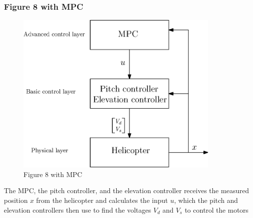 \subsubsection{Figure 8 with MPC}
\begin{figure}[H]
	\centering
	\includegraphics[width=10cm]{figurate_with_MPC}
	\caption{Figure 8 with MPC}
	\label{fig:figurate}
\end{figure}

The MPC, the pitch controller, and the elevation controller receives the measured position $x$ from the helicopter and calculates the input $u$, which the pitch and elevation controllers then use to find the voltages $V_d$ and $V_s$ to control the motors
